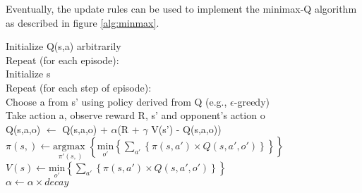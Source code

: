 Eventually, the update rules can be used to implement the minimax-Q algorithm as described in figure \ref{alg:minmax}.

\begin{center} 
\begin{mdframed}
\begin{algorithm}[H]
Initialize Q(s,a) arbitrarily \\
Repeat (for each episode):\\
\tab Initialize s \\
\tab Repeat (for each step of episode):\\
\dtab Choose a from s' using policy derived from Q (e.g., $\epsilon$-greedy)\\
\dtab Take action a, observe reward R, s' and opponent's action o\\
\dtab Q(s,a,o) $\leftarrow$ Q(s,a,o) + $\alpha $(R + $\gamma$ V(s') - Q(s,a,o))  \\
\dtab $\pi(s,) \leftarrow \underset{\pi'(s,)}{\text{argmax }} \left\{ \underset{o'}{\text{min}} \left\{ \sum_{a'}  \left\{ \pi(s,a') \times Q(s,a',o') \right\} \right\} \right\}$ \\
\dtab $ V(s) \leftarrow \underset{o'}{\text{min}} \left\{ \sum_{a'}  \left\{ \pi(s,a') \times Q(s,a',o') \right\} \right\}  $ \\
\dtab $\alpha \leftarrow \alpha \times decay$
\end{algorithm}
\end{mdframed}
\label{alg:minmax}
\end{center}


